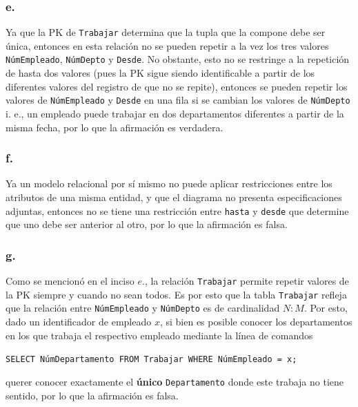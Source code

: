 \subsubsection*{e.}
Ya que la PK de \texttt{Trabajar} determina que la tupla que la compone debe ser única, entonces en esta relación no se pueden repetir a la vez los tres valores \texttt{NúmEmpleado}, \texttt{NúmDepto} y \texttt{Desde}. No obstante, esto no se restringe a la repetición de hasta dos valores (pues la PK sigue siendo identificable a partir de los diferentes valores del registro de que no se repite), entonces se pueden repetir los valores de \texttt{NúmEmpleado} y \texttt{Desde} en una fila si se cambian los valores de \texttt{NúmDepto} i. e., un empleado puede trabajar en dos departamentos diferentes a partir de la misma fecha, por lo que la afirmación es verdadera.

\subsubsection*{f.}
Ya un modelo relacional por sí mismo no puede aplicar restricciones entre los atributos de una misma entidad, y que el diagrama no presenta especificaciones adjuntas, entonces no se tiene una restricción entre \texttt{hasta} y \texttt{desde} que determine que uno debe ser anterior al otro, por lo que la afirmación es falsa.

\subsubsection*{g.}
Como se mencionó en el inciso $e.$, la relación \texttt{Trabajar} permite repetir valores de la PK siempre y cuando no sean todos. Es por esto que la tabla \texttt{Trabajar} refleja que la relación entre \texttt{NúmEmpleado} y \texttt{NúmDepto} es de cardinalidad $N:M$. Por esto, dado un identificador de empleado $x$, si bien es posible conocer los departamentos en los que trabaja el respectivo empleado mediante la línea de comandos
\begin{center}
    \texttt{SELECT NúmDepartamento FROM Trabajar WHERE NúmEmpleado = x;}
\end{center}
querer conocer exactamente el \textbf{único} \texttt{Departamento} donde este trabaja no tiene sentido, por lo que la afirmación es falsa.

